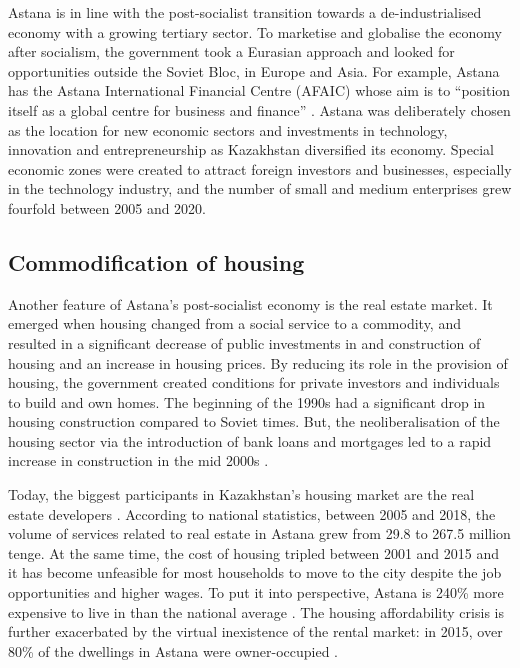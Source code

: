 \documentclass{article}
\begin{document}
Astana is in line with the post-socialist transition towards a de-industrialised economy with a growing tertiary sector. To marketise and globalise the economy after socialism, the government took a Eurasian approach and looked for opportunities outside the Soviet Bloc, in Europe and Asia. For example, Astana has the Astana International Financial Centre (AFAIC) whose aim is to ``position itself as a global centre for business and finance'' \parencite{aifc}. Astana was deliberately chosen as the location for new economic sectors and investments in technology, innovation and entrepreneurship as Kazakhstan diversified its economy. Special economic zones were created to attract foreign investors and businesses, especially in the technology industry, and the number of small and medium enterprises grew fourfold between 2005 and 2020.

\subsection{Commodification of housing}

Another feature of Astana's post-socialist economy is the real estate market. It emerged when housing changed from a social service to a commodity, and resulted in a significant decrease of public investments in and construction of housing and an increase in housing prices. 
By reducing its role in the provision of housing, the government created conditions for private investors and individuals to build and own homes. The beginning of the 1990s had a significant drop in housing construction compared to Soviet times. But, the neoliberalisation of the housing sector via the introduction of bank loans and mortgages led to a rapid increase in construction in the mid 2000s \parencite{unece2018housing}.

Today, the biggest participants in Kazakhstan's housing market are the real estate developers \parencite{unece2018housing}. According to national statistics, between 2005 and 2018, the volume of services related to real estate in Astana grew from 29.8 to 267.5 million tenge.
At the same time, the cost of housing tripled between 2001 and 2015 \parencite{seitz2021urbanization} and it has become unfeasible for most households to move to the city despite the job opportunities and higher wages. To put it into perspective, Astana is 240\% more expensive to live in than the national average \parencite{seitz2021urbanization}. The housing affordability crisis is further exacerbated by the virtual inexistence of the rental market: in 2015, over 80\% of the dwellings in Astana were owner-occupied \parencite{seitz2021urbanization}.
\end{document}
